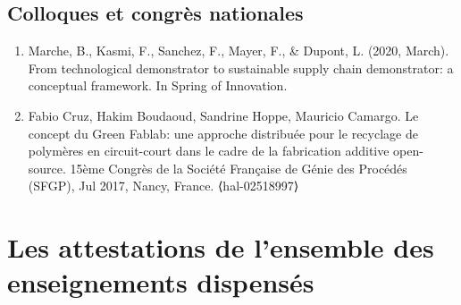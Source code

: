 \documentclass[
  12pt,
  oneside]{book}
\begin{document}
\hypertarget{colloques-et-congruxe8s-nationales}{%
\section{Colloques et congrès nationales}\label{colloques-et-congruxe8s-nationales}}

\begin{enumerate}
\def\labelenumi{\arabic{enumi}.}
\item
  Marche, B., Kasmi, F., Sanchez, F., Mayer, F., \& Dupont, L. (2020, March). From technological demonstrator to sustainable supply chain demonstrator: a conceptual framework. In Spring of Innovation.
\item
  Fabio Cruz, Hakim Boudaoud, Sandrine Hoppe, Mauricio Camargo. Le concept du Green Fablab: une approche distribuée pour le recyclage de polymères en circuit-court dans le cadre de la fabrication additive open-source. 15ème Congrès de la Société Française de Génie des Procédés (SFGP), Jul 2017, Nancy, France. ⟨hal-02518997⟩
\end{enumerate}

\hypertarget{les-attestations-de-lensemble-des-enseignements-dispensuxe9s}{%
\chapter{Les attestations de l'ensemble des enseignements dispensés}\label{les-attestations-de-lensemble-des-enseignements-dispensuxe9s}}


\end{document}
